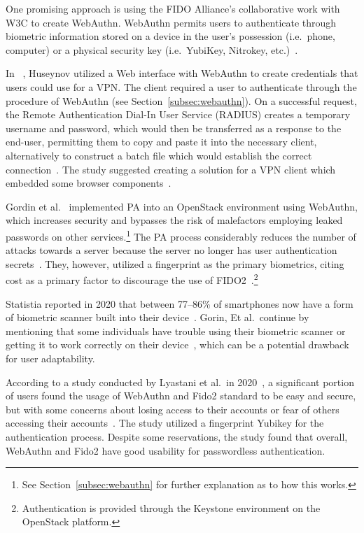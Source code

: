 One promising approach is using the FIDO Alliance's collaborative work with W3C to create WebAuthn.
WebAuthn permits users to authenticate through biometric information
stored on a device in the user's possession (i.e.\ phone, computer) or a
physical security key (i.e.\ YubiKey, Nitrokey, etc.)~\cite{webauthn_level_2}.

In ~\cite{huseynov2022passwordless}, Huseynov utilized a
Web interface with WebAuthn to create credentials that users could use for a VPN\@.
The client required a user to authenticate through the procedure of WebAuthn (see Section~\ref{subsec:webauthn}).
On a successful request, the Remote Authentication Dial-In User Service (RADIUS) creates a temporary username and password, which would then be transferred
as a response to the end-user, permitting them to copy and paste it into the necessary client, alternatively to construct a batch file which would establish the correct connection~\cite{huseynov2022passwordless}.
The study suggested creating a solution for a VPN client which embedded some browser components~\cite{huseynov2022passwordless}.

Gordin et al.~\cite{gordin2021moving} implemented PA into an OpenStack
environment using WebAuthn, which increases security and bypasses the risk of
malefactors employing leaked passwords on other services.\footnote{
  See Section~\ref{subsec:webauthn} for further explanation as to how this
  works.
}
The PA process considerably reduces the number of attacks towards a server because the server no longer has user authentication secrets~\cite{gordin2021moving}.
They, however, utilized a fingerprint as the primary biometrics, citing cost as a primary factor to discourage the use of FIDO2~\cite{gordin2021moving}.\footnote{
  Authentication is provided through the Keystone environment on the OpenStack platform.
}

Statistia reported in 2020 that between 77--86\% of smartphones now have a form of biometric scanner built into their device~\cite{statista-biometric-transactions}.
Gorin, Et al.\ continue by mentioning that some individuals have trouble
using their biometric scanner or getting it to work correctly on their
device~\cite{gordin2021moving}, which can be a potential drawback for user adaptability.

According to a study conducted by Lyastani et al.\ in 2020~\cite{
  ghrobany2020fido2}, a significant portion of users found the usage of WebAuthn and Fido2 standard to be easy and secure, but with some concerns about losing access to their accounts or fear of others accessing their accounts~\cite{
  ghrobany2020fido2}.
The study utilized a fingerprint Yubikey for the authentication process.
Despite some reservations, the study found that overall, WebAuthn and Fido2
have good usability for passwordless authentication.

